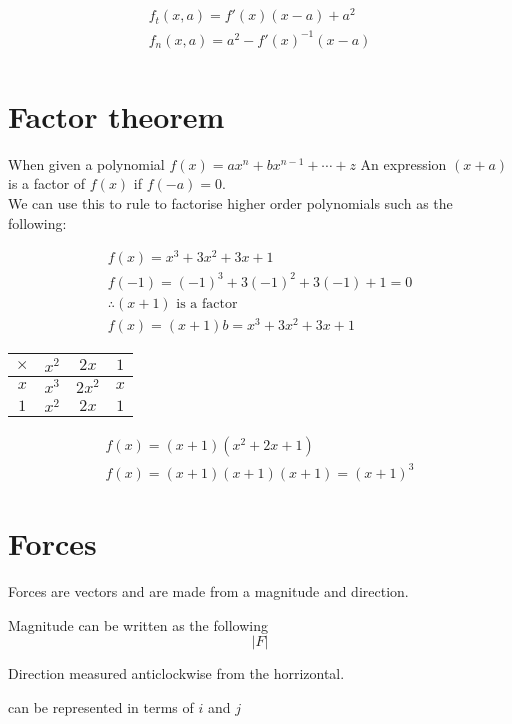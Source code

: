 \documentclass{article}
\begin{document}
\begin{gather}
	f_t(x, a) = f'(x)(x-a) + a^2 \\
	f_n(x, a) = a^2 -f'(x)^{-1}(x-a) \\
\end{gather}

\section{Factor theorem}
When given a polynomial $f(x) = ax^n + bx^{n-1} + \cdots + z $
An expression $(x + a)$ is a factor of $f(x)$ if $f(-a) = 0$.
\\
We can use this to rule to factorise higher order polynomials such as the following:

\begin{gather}
	f(x) = x^3 + 3x^2 + 3x + 1 \\
	f(-1) = (-1)^3 + 3(-1)^2 + 3(-1) + 1 = 0\\
	\therefore (x + 1) \text{ is a factor} \\
	f(x) = (x+1)b = x^3 + 3x^2 + 3x + 1
\end{gather}

\begin{center}
	\begin{tabular}{ c | c | c | c }
		$\times$ & $x^2$ & $2x$ & $1$\\ \hline
		$x$ & $x^3$ & $2x^2$ & $x$  \\ \hline
		$1$ & $x^2$ & $2x$ & $1$\\
	\end{tabular}
\end{center}

\begin{gather}
	f(x) = (x+1)(x^2 + 2x + 1) \\
	f(x) = (x+1)(x+1)(x+1) = (x+1)^3
\end{gather}

\section{Forces}
Forces are vectors and are made from a magnitude and direction.

Magnitude can be written as the following
\begin{equation}
	\lvert F \rvert
\end{equation}

Direction measured anticlockwise from the horrizontal.

can be represented in terms of $i$ and $j$
\end{document}
